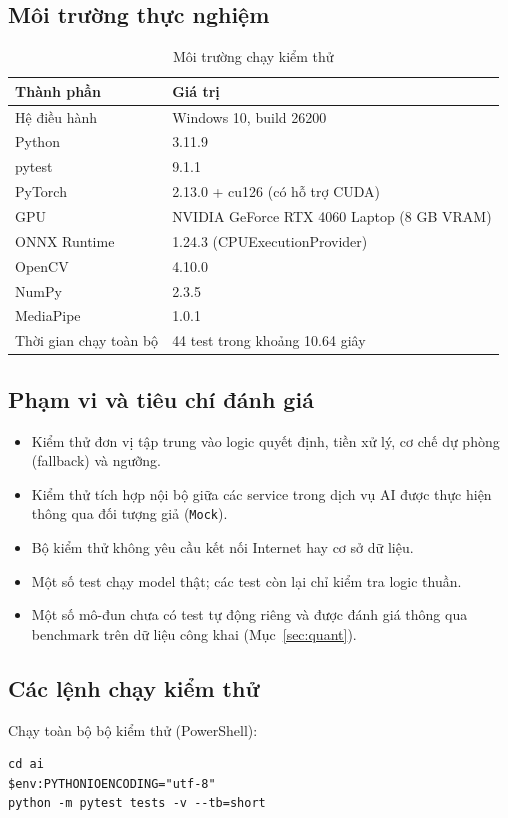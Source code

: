\documentclass[12pt,a4paper]{article}
\begin{document}
\subsection{Môi trường thực nghiệm}
\begin{table}[H]
  \centering
  \caption{Môi trường chạy kiểm thử}
  \label{tab:env}
  \small
  \begin{tabular}{@{}ll@{}}
    \toprule
    \textbf{Thành phần} & \textbf{Giá trị}\\
    \midrule
    Hệ điều hành & Windows 10, build 26200\\
    Python & 3.11.9\\
    pytest & 9.1.1\\
    PyTorch & 2.13.0 + cu126 (có hỗ trợ CUDA)\\
    GPU & NVIDIA GeForce RTX 4060 Laptop (8 GB VRAM)\\
    ONNX Runtime & 1.24.3 (CPUExecutionProvider)\\
    OpenCV & 4.10.0\\
    NumPy & 2.3.5\\
    MediaPipe & 1.0.1\\
    Thời gian chạy toàn bộ & 44 test trong khoảng \num{10.64} giây\\
    \bottomrule
  \end{tabular}
\end{table}

\subsection{Phạm vi và tiêu chí đánh giá}
\begin{itemize}
  \item Kiểm thử đơn vị tập trung vào logic quyết định, tiền xử lý, cơ chế dự phòng (fallback) và ngưỡng.
  \item Kiểm thử tích hợp nội bộ giữa các service trong dịch vụ AI được thực hiện thông qua đối tượng giả (\texttt{Mock}).
  \item Bộ kiểm thử không yêu cầu kết nối Internet hay cơ sở dữ liệu.
  \item Một số test chạy model thật; các test còn lại chỉ kiểm tra logic thuần.
  \item Một số mô-đun chưa có test tự động riêng và được đánh giá thông qua benchmark trên dữ liệu công khai (Mục~\ref{sec:quant}).
\end{itemize}

\subsection{Các lệnh chạy kiểm thử}
Chạy toàn bộ bộ kiểm thử (PowerShell):
\begin{lstlisting}
cd ai
$env:PYTHONIOENCODING="utf-8"
python -m pytest tests -v --tb=short
\end{lstlisting}
\end{document}
